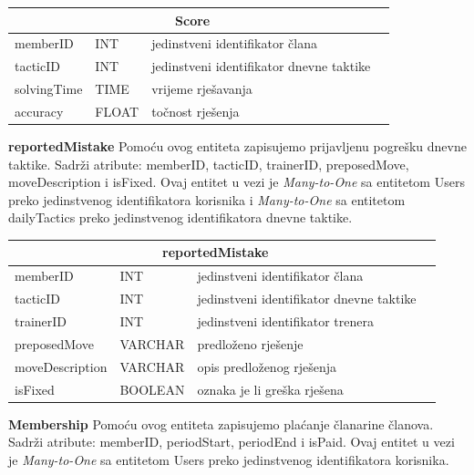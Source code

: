\documentclass{article}
\begin{document}
\begin{center}
    \begin{tabular}{ | l | l | l | p{5cm} |}
    \hline
    \multicolumn{3}{|c|}{Score}  \\ \hline
   \cellcolor{green!25}memberID & INT & jedinstveni identifikator člana \\ \hline
    \cellcolor{blue!15}tacticID & INT & jedinstveni identifikator dnevne taktike \\ \hline
    solvingTime & TIME & vrijeme rješavanja\\ \hline 
    accuracy & FLOAT & točnost rješenja\\ \hline
    \end{tabular}
\end{center}
\eject



\textbf{reportedMistake} Pomoću ovog entiteta zapisujemo prijavljenu pogrešku dnevne taktike. Sadrži atribute: memberID, tacticID, trainerID, preposedMove, moveDescription i isFixed. Ovaj entitet u vezi je \textit{Many-to-One} sa entitetom Users preko jedinstvenog identifikatora korisnika i \textit{Many-to-One} sa entitetom dailyTactics preko jedinstvenog identifikatora dnevne taktike.
		\\
		



\begin{center}
    \begin{tabular}{ | l | l | l | p{5cm} |}
    \hline
    \multicolumn{3}{|c|}{reportedMistake}  \\ \hline
   \cellcolor{green!25}memberID & INT & jedinstveni identifikator člana \\ \hline
    \cellcolor{green!25}tacticID & INT & jedinstveni identifikator dnevne taktike \\ \hline
     \cellcolor{blue!15}trainerID & INT & jedinstveni identifikator trenera \\ \hline
    preposedMove & VARCHAR & predloženo rješenje \\ \hline 
     moveDescription & VARCHAR & opis predloženog rješenja \\ \hline
     isFixed & BOOLEAN & oznaka je li greška rješena\\ \hline
    \end{tabular}
\end{center}
\bigskip
\bigskip



\textbf{Membership} Pomoću ovog entiteta zapisujemo plaćanje članarine članova. Sadrži atribute: memberID, periodStart, periodEnd i isPaid. Ovaj entitet u vezi je \textit{Many-to-One} sa entitetom Users preko jedinstvenog identifikatora korisnika.
		\\
\end{document}
